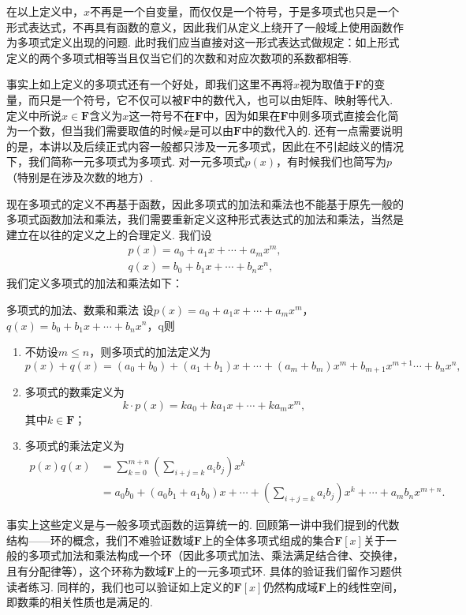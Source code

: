 在以上定义中，$x$不再是一个自变量，而仅仅是一个符号，于是多项式也只是一个形式表达式，不再具有函数的意义，因此我们从定义上绕开了一般域上使用函数作为多项式定义出现的问题. 此时我们应当直接对这一形式表达式做规定：如上形式定义的两个多项式相等当且仅当它们的次数和对应次数项的系数都相等.

事实上如上定义的多项式还有一个好处，即我们这里不再将$x$视为取值于$\mathbf{F}$的变量，而只是一个符号，它不仅可以被$\mathbf{F}$中的数代入，也可以由矩阵、映射等代入. 定义中所说$x\in\mathbf{F}$含义为$x$这一符号不在$\mathbf{F}$中，因为如果在$\mathbf{F}$中则多项式直接会化简为一个数，但当我们需要取值的时候$x$是可以由$\mathbf{F}$中的数代入的. 还有一点需要说明的是，本讲以及后续正式内容一般都只涉及一元多项式，因此在不引起歧义的情况下，我们简称一元多项式为多项式. 对一元多项式$p(x)$，有时候我们也简写为$p$（特别是在涉及次数的地方）.

现在多项式的定义不再基于函数，因此多项式的加法和乘法也不能基于原先一般的多项式函数加法和乘法，我们需要重新定义这种形式表达式的加法和乘法，当然是建立在以往的定义之上的合理定义. 我们设
\begin{gather*}
    p(x)=a_0+a_1x+\cdots+a_mx^m,\\
    q(x)=b_0+b_1x+\cdots+b_nx^n,
\end{gather*}
我们定义多项式的加法和乘法如下：
\begin{definition}{多项式的加法、数乘和乘法}{}
    设$p(x)=a_0+a_1x+\cdots+a_mx^m$，$q(x)=b_0+b_1x+\cdots+b_nx^n$，q则
    \begin{enumerate}
        \item 不妨设$m\leqslant n$，则多项式的加法定义为
              \[p(x)+q(x)=(a_0+b_0)+(a_1+b_1)x+\cdots+(a_m+b_m)x^m+b_{m+1}x^{m+1}\cdots+b_nx^n,\]
        \item 多项式的数乘定义为
              \[k\cdot p(x)=ka_0+ka_1x+\cdots+ka_mx^m,\]
              其中$k\in\mathbf{F}$；
        \item 多项式的乘法定义为
              \begin{align*}
                  p(x)q(x) & =\sum_{k=0}^{m+n}\left(\sum_{i+j=k}a_ib_j\right)x^k                                      \\
                           & =a_0b_0+(a_0b_1+a_1b_0)x+\cdots+\left(\sum_{i+j=k}a_ib_j\right)x^k+\cdots+a_mb_nx^{m+n}.
              \end{align*}
    \end{enumerate}
\end{definition}
事实上这些定义是与一般多项式函数的运算统一的. 回顾第一讲中我们提到的代数结构——环的概念，我们不难验证数域$\mathbf{F}$上的全体多项式组成的集合$\mathbf{F}[x]$关于一般的多项式加法和乘法构成一个环（因此多项式加法、乘法满足结合律、交换律，且有分配律等），这个环称为数域$\mathbf{F}$上的一元多项式环. 具体的验证我们留作习题供读者练习. 同样的，我们也可以验证如上定义的$\mathbf{F}[x]$仍然构成域$\mathbf{F}$上的线性空间，即数乘的相关性质也是满足的.

